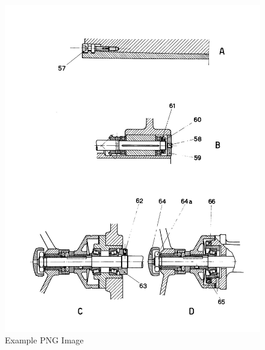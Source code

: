 \newpage
\begin{figure}[h]
    \centering
    \includegraphics[width=1.0\linewidth]{images/page_27}
    \caption{Example PNG Image}
    \label{fig:handwheel_bearings}
\end{figure}
